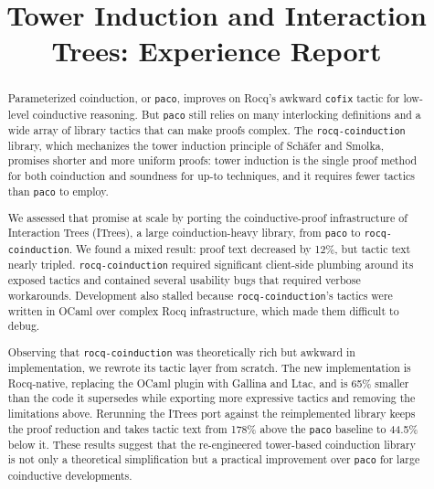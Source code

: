 \documentclass[sigplan,10pt,anonymous,review]{acmart}
\begin{document}
\title{Tower Induction and Interaction Trees: Experience Report}

\begin{abstract}
Parameterized coinduction, or \texttt{paco}, improves on Rocq's awkward
\texttt{cofix} tactic for low-level coinductive reasoning. But \texttt{paco}
still relies on many interlocking definitions and a wide array of library
tactics that can make proofs complex. The \texttt{rocq-coinduction} library,
which mechanizes the tower induction principle of Sch\"afer and Smolka, promises
shorter and more uniform proofs: tower induction is the single proof method for
both coinduction and soundness for up-to techniques, and it requires fewer
tactics than \texttt{paco} to employ.

We assessed that promise at scale by porting the coinductive-proof
infrastructure of Interaction Trees (ITrees), a large coinduction-heavy library,
from \texttt{paco} to \texttt{rocq-coinduction}. We found a mixed result: proof
text decreased by 12\%, but tactic text nearly tripled.
\texttt{rocq-coinduction} required significant client-side plumbing around its
exposed tactics and contained several usability bugs that required verbose
workarounds. Development also stalled because \texttt{rocq-coinduction}'s
tactics were written in OCaml over complex Rocq infrastructure, which made them
difficult to debug.

Observing that \texttt{rocq-coinduction} was theoretically rich but awkward in
implementation, we rewrote its tactic layer from scratch. The new implementation
is Rocq-native, replacing the OCaml plugin with Gallina and Ltac, and is 65\%
smaller than the code it supersedes while exporting more expressive tactics and
removing the limitations above. Rerunning the ITrees port against the
reimplemented library keeps the proof reduction and takes tactic text from
178\% above the \texttt{paco} baseline to 44.5\% below it. These results suggest
that the re-engineered tower-based coinduction library is not only a theoretical
simplification but a practical improvement over \texttt{paco} for large
coinductive developments.
\end{abstract}

\maketitle
\thispagestyle{empty}
\end{document}

